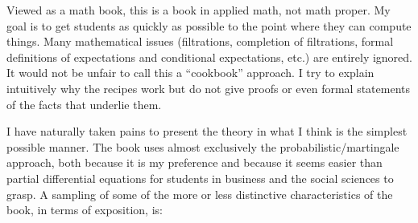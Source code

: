 Viewed as a math book, this is a book in applied math, not math proper.  My goal is to get students as quickly as possible to the point where they can compute things.  Many mathematical issues  (filtrations, completion of filtrations, formal definitions of expectations and conditional expectations, etc.) are entirely ignored.  It would not be unfair to call this a ``cookbook'' approach.  I try to explain intuitively why the recipes work but do not give proofs or even formal statements of the facts that underlie them.

I have naturally taken pains to present the theory in what I think is the simplest possible manner.   The book uses almost exclusively the probabilistic/martingale approach, both because it is my preference and because it seems easier than partial differential equations for students in business and the social sciences to grasp.    A sampling of some of the more or less distinctive characteristics of the book, in terms of exposition, is:
